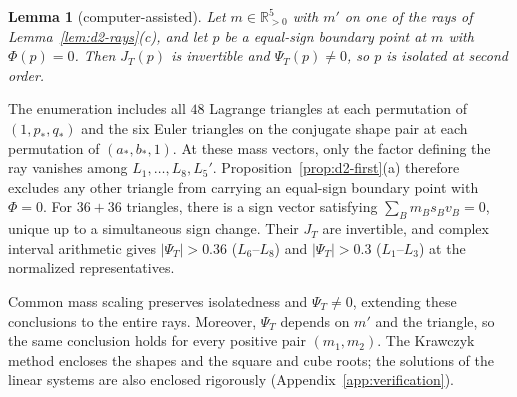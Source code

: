 \documentclass[Threeside,11pt]{article}
\newtheorem{lemma}[theorem]{Lemma}
\theoremstyle{definition}
\theoremstyle{remark}
\numberwithin{equation}{section}
\theoremstyle{remark}
\newcommand{\Rp}{\mathbb{R}_{>0}}
\begin{document}
\begin{lemma}[computer-assisted]\label{lem:d2-Lray}
Let $m\in\Rp^5$ with $m'$ on one of the rays of Lemma~\ref{lem:d2-rays}(c), and let $p$ be a
equal-sign boundary point at $m$ with $\Phi(p)=0$.  Then $J_T(p)$ is invertible and $\Psi_T(p)\ne0$, so $p$
is isolated at second order.
\end{lemma}

{The enumeration includes all $48$ Lagrange triangles at each
permutation of $(1,p_*,q_*)$ and the six Euler triangles on the conjugate shape pair at
each permutation of $(a_*,b_*,1)$.
At these mass vectors, only the factor defining the ray vanishes among
$L_1,\dots,L_8,L_5'$.  Proposition~\ref{prop:d2-first}(a) therefore excludes any other
triangle from carrying an equal-sign boundary point with $\Phi=0$.
For $36+36$ triangles, there is a sign vector satisfying $\sum_Bm_Bs_Bv_B=0$, unique up
to a simultaneous sign change.  Their $J_T$ are invertible, and complex interval
arithmetic gives $|\Psi_T|>0.36$ ($L_6$--$L_8$) and $|\Psi_T|>0.3$ ($L_1$--$L_3$) at the
normalized representatives.

Common mass scaling preserves isolatedness and $\Psi_T\ne0$, extending these
conclusions to the entire rays. Moreover, $\Psi_T$ depends on $m'$ and the triangle,
so the same conclusion holds for every positive pair $(m_1,m_2)$.
The Krawczyk method encloses the shapes and the square and cube roots; the solutions of
the linear systems are also enclosed rigorously (Appendix~\ref{app:verification}).}
\end{document}
